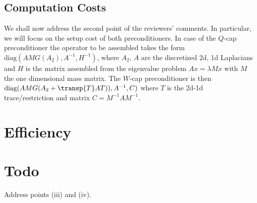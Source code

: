 \documentclass[10pt, a4paper]{article}
\begin{document}
\subsection*{Computation Costs} We shall now address the second point of the reviewers' comments. In particular, we will focus 
on the setup cost of both preconditioners. In case of the $Q$-cap preconditioner the operator to be assembled takes the form
$\text{diag}(AMG(A_2), A^{-1}, H^{-1})$, where $A_2$, $A$ are the discretized 2d, 1d Laplacians and $H$ is the matrix assembled from
the eigenvalue problem $Ax=\lambda M x$ with $M$ the one dimensional mass matrix. The $W$-cap preconditioner is then 
$\text{diag}(AMG(A_2+\transp{T}AT)), A^{-1}, C)$ where $T$ is the 2d-1d trace/restriction and matrix $C=M^{-1}AM^{-1}$. 




\section*{Efficiency}

\section*{Todo}
Address points (iii) and (iv).



\end{document}
